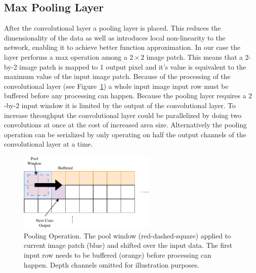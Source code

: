 \subsection{Max Pooling Layer}

After the convolutional layer a pooling layer is placed. This reduces the dimensionality of the data as well as introduces local non-linearity to the network, enabling it to achieve better function approximation. In our case the layer performs a max operation among a $2 \times 2$ image patch. This means that a 2-by-2 image patch is mapped to 1 output pixel and it's value is equivalent to the maximum value of the input image patch.
Because of the processing of the convolutional layer (see Figure~\ref{fig:hw-conv-operation}) a whole input image input row must be buffered before any processing can happen. Because the pooling layer requires a $2$-by-$2$ input window it is limited by the output of the convolutional layer. To increase throughput the convolutional layer could be parallelized by doing two convolutions at once at the cost of increased area size. Alternatively the pooling operation can be serialized by only operating on half the output channels of the convolutional layer at a time.

\begin{figure}[hb]
	\centering
	\includegraphics[width=0.6\textwidth]{img/pool.pdf}
	\caption[Pooling Operation]{Pooling Operation. The pool window (red-dashed-square) applied to current image patch (blue) and shifted over the input data. The first input row needs to be buffered (orange) before processing can happen. Depth channels omitted for illustration purposes.}
	\label{fig:hw-conv-operation}
\end{figure}



